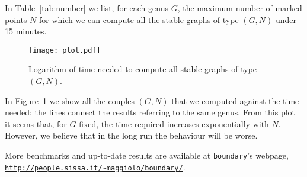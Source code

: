 \documentclass{amsart}
\theoremstyle{plain}
\theoremstyle{definition}
\begin{document}
In Table~\ref{tab:number} we list, for each genus $G$, the maximum
number of marked points $N$ for which we can compute all the stable
graphs of type $(G, N)$ under 15 minutes.

\begin{figure}\label{fig:plot}
  \texttt{[image: plot.pdf]}
  \caption{Logarithm of time needed to compute all stable graphs of
    type $(G, N)$.}
\end{figure}

In Figure~\ref{fig:plot} we show all the couples $(G, N)$ that we
computed against the time needed; the lines connect the results
referring to the same genus. From this plot it seems that, for $G$
fixed, the time required increases exponentially with $N$. However, we
believe that in the long run the behaviour will be worse.

More benchmarks and up-to-date results are available at
\texttt{boundary}'s webpage,
\href{http://people.sissa.it/~maggiolo/boundary/}
{\texttt{http://people.sissa.it/\~{}maggiolo/boundary/}}.
\end{document}

